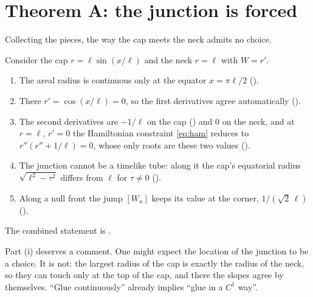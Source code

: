 \section{Theorem A: the junction is forced}

Collecting the pieces, the way the cap meets the neck admits no choice.

\begin{theorem}\proved\label{thm:A}
Consider the cap $r=\ell\sin(x/\ell)$ and the neck $r=\ell$ with $W=r'$.
\begin{enumerate}[label=(\roman*)]
\item The areal radius is continuous only at the equator $x=\pi\ell/2$ ().
\item There $r'=\cos(x/\ell)=0$, so the first derivatives agree automatically ().
\item The second derivatives are $-1/\ell$ on the cap () and $0$ on the neck, and at $r=\ell$, $r'=0$ the Hamiltonian constraint \eqref{eq:ham} reduces to $r''(r''+1/\ell)=0$, whose only roots are these two values ().
\item The junction cannot be a timelike tube: along it the cap's equatorial radius $\sqrt{\ell^2-\tau^2}$ differs from $\ell$ for $\tau\ne0$ ().
\item Along a null front the jump $[W_u]$ keeps its value at the corner, $1/(\sqrt2\,\ell)$ ().
\end{enumerate}
\end{theorem}
\noindent The combined statement is .

Part (i) deserves a comment. One might expect the location of the junction to be a choice. It is not: the largest radius of the cap is exactly the radius of the neck, so they can touch only at the top of the cap, and there the slopes agree by themselves. ``Glue continuously'' already implies ``glue in a $C^1$ way''.

